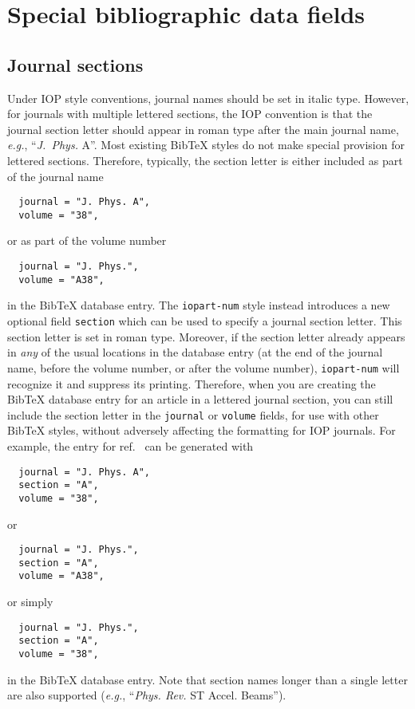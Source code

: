 \documentclass[12pt]{iopart}
\newcommand{\BibTeX}{Bib\TeX}
\begin{document}
\section{Special bibliographic data fields}

\subsection{Journal sections}

Under IOP style conventions, journal names should be set in italic
type.  However, for journals with multiple lettered sections, the IOP
convention is that the journal section letter should appear in roman
type after the main journal name, \textit{e.g.}, ``\textit{J.\
Phys.\/} A''.  Most existing \BibTeX{} styles do not make special
provision for lettered sections.  Therefore, typically, the section
letter is either included as part of the journal name
\begin{verbatim}
  journal = "J. Phys. A",
  volume = "38",
\end{verbatim}
or as part of the volume number
\begin{verbatim}
  journal = "J. Phys.",
  volume = "A38",
\end{verbatim}
in the \BibTeX{} database entry.  The \texttt{iopart-num} style
instead introduces a new optional field \verb+section+ which can be
used to specify a journal section letter.  This section letter is set in
roman type.  Moreover, if the section letter already appears in
\textit{any} of the usual locations in the database entry (at the end
of the journal name, before the volume number, or after the volume
number),
\texttt{iopart-num} will recognize it and suppress its printing.
Therefore, when you are creating the
\BibTeX{} database entry for an article in a lettered journal section,
you can still include the section letter in the \verb+journal+ or
\verb+volume+ fields, for use with other \BibTeX{} styles, 
without adversely affecting the formatting for IOP journals.  For
example, the entry for ref.~\cite{caprio2005:coherent} can be
generated with
\begin{verbatim}
  journal = "J. Phys. A",
  section = "A",
  volume = "38",
\end{verbatim}
or
\begin{verbatim}
  journal = "J. Phys.",
  section = "A",
  volume = "A38",
\end{verbatim}
or simply
\begin{verbatim}
  journal = "J. Phys.",
  section = "A",
  volume = "38",
\end{verbatim}
in the \BibTeX{} database entry.  Note that section names longer than a
single letter are also supported (\textit{e.g.},
``\textit{Phys. Rev.\/} ST Accel. Beams'').
\end{document}
